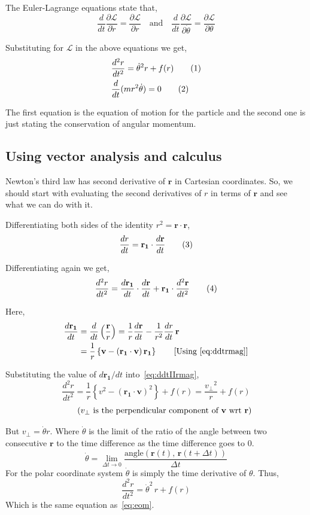 \documentclass[a4paper, 12pt]{article}
\renewcommand{\indent}{\hspace{3ex}}
\newcommand\labelthis[1]{\addtocounter{equation}{1}\tag{\theequation}\label{#1}}
\renewcommand{\r}{\mathbf{r}}
\newcommand{\ru}{\mathbf{r_1}}
\renewcommand{\v}{\mathbf{v}}
\newcommand{\ddt}[1]{\frac{d#1}{dt}}
\newcommand{\ddtII}[1]{\frac{d^2#1}{dt^2}}
\newcommand{\Lagr}{\mathcal{L}}
\begin{document}
The Euler-Lagrange equations state that,
\[	\ddt{} \frac{\partial \Lagr}{\partial \dot{r}} = \frac{\partial \Lagr}{\partial r} \quad\text{and}\quad
\ddt{} \frac{\partial \Lagr}{\partial \dot{\theta}} = \frac{\partial \Lagr}{\partial \theta} \]

Substituting for $\Lagr$ in the above equations we get,
\begin{align}
	&\ddtII{r} = \dot{\theta}^2 r + f(r) \labelthis{eq:eom} \\
	&\ddt{} (m r^2 \dot{\theta}) = 0 \labelthis{eq:conserv L lagrangian}
\end{align}

The first equation is the equation of motion for the particle and the second one is just stating the conservation of angular momentum.

\subsection{Using vector analysis and calculus}\label{eom vector calculus}

\indent Newton's third law has second derivative of $\r$ in Cartesian coordinates. So, we should start with evaluating the second derivatives of $r$ in terms of $\r$ and see what we can do with it.

\medskip Differentiating both sides of the identity $r^2 = \r \cdot \r$,
\[ \ddt{r} = \ru \cdot \ddt{\r} \labelthis{eq:ddtrmag} \]

Differentiating again we get,
\[ \ddtII{r} = \ddt{\ru} \cdot \ddt{\r} + \ru \cdot \ddtII{\r} \labelthis{eq:ddtIIrmag} \]

Here,
\begin{align*}
	\ddt{\ru} &= \ddt{} \left( {\frac{\r}{r}} \right) = \frac{1}{r} \ddt{\r} - \frac{1}{r^2} \ddt{r} \, \r \\
			  &= \frac{1}{r} \left\{ \v - \left( \ru \cdot \v \right) \ru \right\} \tag*{[Using~\eqref{eq:ddtrmag}]}
\end{align*}

Substituting the value of $d\ru/dt$ into~\eqref{eq:ddtIIrmag},
\[ \ddtII{r} = \frac{1}{r} \left\{ v^2 - {\left( \ru \cdot \v \right)}^2 \right\} + f(r)
																					= \frac{{v_\bot}^2}{r} + f(r) \]
\[ \tag{$v_\bot$ is the perpendicular component of $\v$ wrt $\r$} \]

But $v_\bot = \dot{\theta} r$. Where $\dot{\theta}$ is the limit of the ratio of the angle between two consecutive $\r$ to the time difference as the time difference goes to $0$.
\[ \dot{\theta} = \lim_{\Delta t \to 0} \frac{\text{angle}(\r(t), \, \r(t + \Delta t))}{\Delta t} \]
For the polar coordinate system $\dot{\theta}$ is simply the time derivative of $\theta$.  Thus,
\[ \ddtII{r} = \dot{\theta}^2 \, r + f(r) \]
Which is the same equation as~\eqref{eq:eom}.
\end{document}
